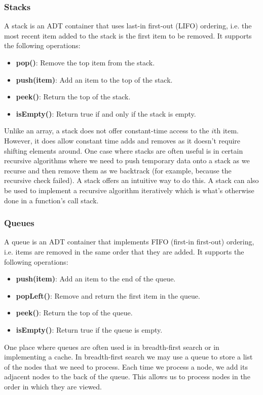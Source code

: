\documentclass{article}
\begin{document}
    \subsubsection{Stacks}
    A stack is an ADT container that uses last-in first-out (LIFO) ordering, i.e. the most recent item added to the stack is the first item to be removed. It supports the following operations:
    \begin{itemize}
        \item  \textbf{pop()}: Remove the top item from the stack.
        \item  \textbf{push(item)}: Add an item to the top of the stack.
        \item \textbf{peek()}: Return the top of the stack.
        \item \textbf{isEmpty()}: Return true if and only if the stack is empty.
    \end{itemize}
    Unlike an array, a stack does not offer constant-time access to the $i$th item. However, it does allow constant time adds and removes as it doesn't require shifting elements around. One case where stacks are often useful is in certain recursive algorithms where we need to push temporary data onto a stack as we recurse and then remove them as we backtrack (for example, because the recursive check failed). A stack offers an intuitive way to do this. A stack can also be used to implement a recursive algorithm iteratively which is what's otherwise done in a function's call stack.
    
    \subsubsection{Queues}
    A queue is an ADT container that implements FIFO (first-in first-out) ordering, i.e. items are removed in the same order that they are added. It supports the following operations: 
    \begin{itemize}
        \item \textbf{push(item)}: Add an item to the end of the queue.
        \item \textbf{popLeft()}: Remove and return the first item in the queue.
        \item \textbf{peek()}: Return the top of the queue.
        \item \textbf{isEmpty()}: Return true if the queue is empty. 
    \end{itemize}
    
    One place where queues are often used is in breadth-first search or in implementing a cache. In breadth-first search we may use a queue to store a list of the nodes that we need to process. Each time we process a node, we add its adjacent nodes to the back of the queue. This allows us to process nodes in the order in which they are viewed. 
    
\end{document}
